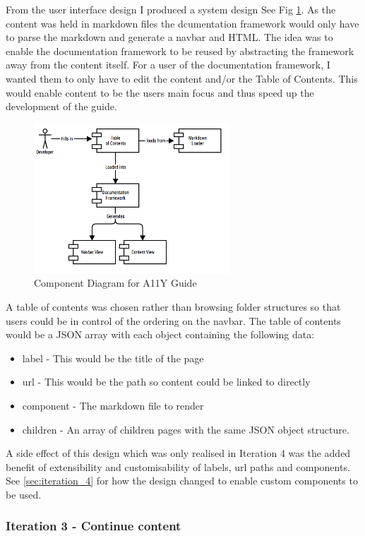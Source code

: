 From the user interface design I produced a system design See Fig
\ref{fig:allycomponent}. As the content was held in markdown files the
dcumentation framework would only have to parse the markdown and generate a
navbar and HTML. The idea was to enable the documentation framework
to be reused by abstracting the framework away from the content itself. For a
user of the documentation framework, I wanted them to only have to edit the
content and/or the Table of Contents. This would enable content to be the
users main focus and thus speed up the development of the guide.
\begin{figure}[H]
\centering
\includegraphics[width=0.65\textwidth]{figures/documentation_design}
\captionsetup{justification=centering}
\caption[Short figure name.]{Component Diagram for A11Y Guide
\label{fig:allycomponent}}
\end{figure}
A table of contents was
chosen rather than browsing folder structures so that users
could be in control of the ordering on the navbar. The table of contents
would be a JSON array with each object containing the following data:
\begin{itemize}
\item label - This would be the title of the page
\item url - This would be the path so content could be linked to directly
\item component - The markdown file to render
\item children - An array of children pages with the same JSON object structure.
\end{itemize}
A side effect of this design which was only realised in Iteration 4 was the
added benefit of extensibility and customisability of labels, url paths and
components. See \ref{sec:iteration_4} for how the design changed to enable
custom components to be used.

\subsubsection{Iteration 3 - Continue content}

